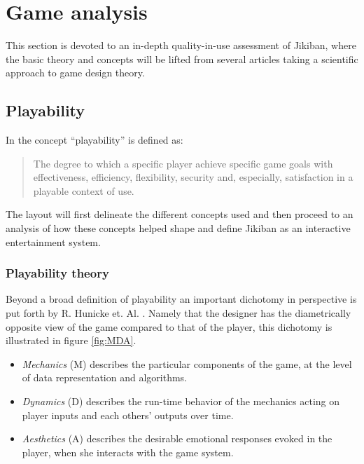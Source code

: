 \section{Game analysis}
This section is devoted to an in-depth quality-in-use assessment of
Jikiban, where the basic theory and concepts will be lifted from
several articles taking a scientific approach to game design theory.

\subsection{Playability}
In \cite{sanchez09} the concept ``playability'' is defined as:

\begin{quotation}
The degree to which a specific player achieve specific game goals with
effectiveness, efficiency, flexibility, security and, especially,
satisfaction in a playable context of use.
\end{quotation}

The layout will first delineate the different concepts used and then
proceed to an analysis of how these concepts helped shape and define
Jikiban as an interactive entertainment system.


\subsubsection{Playability theory}
Beyond a broad definition of playability an important dichotomy in
perspective is put forth by R. Hunicke
et. Al. \cite{hunicke01-04}. Namely that the designer has the
diametrically opposite view of the game compared to that of the
player, this dichotomy is illustrated in figure \ref{fig:MDA}.

\begin{itemize}
\item \emph{Mechanics} (M) describes the particular components of the game, at
  the level of data representation and algorithms.
\item \emph{Dynamics} (D) describes the run-time behavior of the mechanics
  acting on player inputs and each others’ outputs over time.
\item \emph{Aesthetics} (A) describes the desirable emotional responses evoked
  in the player, when she interacts with the game system.
\end{itemize}



